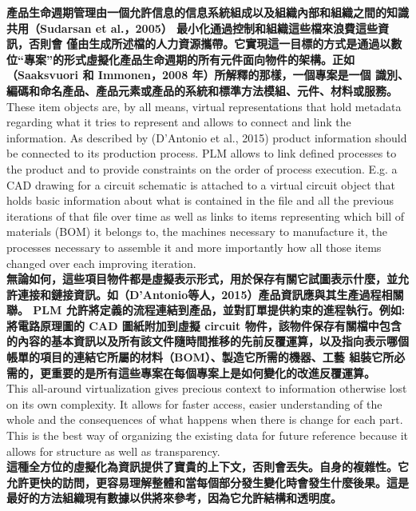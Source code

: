 \documentclass[24pt]{article} %
\begin{document}
\textbf{產品生命週期管理由一個允許信息的信息系統組成以及組織內部和組織之間的知識共用（Sudarsan et al.，2005） 最小化通過控制和組織這些檔來浪費這些資訊，否則會 僅由生成所述檔的人力資源攜帶。它實現這一目標的方式是通過以數位“專案”的形式虛擬化產品生命週期的所有元件面向物件的架構。正如（Saaksvuori 和 Immonen，2008 年）所解釋的那樣，一個專案是一個 識別、編碼和命名產品、產品元素或產品的系統和標準方法模組、元件、材料或服務。}\\

These item objects are, by all means, virtual representations that hold metadata regarding what it tries to represent and allows to connect and link the information. As described by (D’Antonio et al., 2015) product information should be connected to its production process. PLM allows to link defined processes to the product and to provide constraints on the order of process execution. E.g. a CAD drawing for a circuit schematic is attached to a virtual circuit object that holds basic information about what is contained in the file and all the previous iterations of that file over time as well as links to items representing which bill of materials (BOM) it belongs to, the machines necessary to manufacture it, the processes necessary to assemble it and more importantly how all those items changed over each improving iteration.\\

\textbf{無論如何，這些項目物件都是虛擬表示形式，用於保存有關它試圖表示什麼，並允許連接和鏈接資訊。如（D'Antonio等人，2015）產品資訊應與其生產過程相關聯。 PLM 允許將定義的流程連結到產品，並對訂單提供約束的進程執行。例如:將電路原理圖的 CAD 圖紙附加到虛擬 circuit 物件，該物件保存有關檔中包含的內容的基本資訊以及所有該文件隨時間推移的先前反覆運算，以及指向表示哪個帳單的項目的連結它所屬的材料（BOM）、製造它所需的機器、工藝 組裝它所必需的，更重要的是所有這些專案在每個專案上是如何變化的改進反覆運算。}\\

This all-around virtualization gives precious context to information otherwise lost on its own complexity. It allows for faster access, easier understanding of the whole and the consequences of what happens when there is change for each part. This is the best way of organizing the existing data for future reference because it allows for structure as well as
transparency.\\

\textbf{這種全方位的虛擬化為資訊提供了寶貴的上下文，否則會丟失。自身的複雜性。它允許更快的訪問，更容易理解整體和當每個部分發生變化時會發生什麼後果。這是最好的方法組織現有數據以供將來參考，因為它允許結構和透明度。}\\
\end{document}
